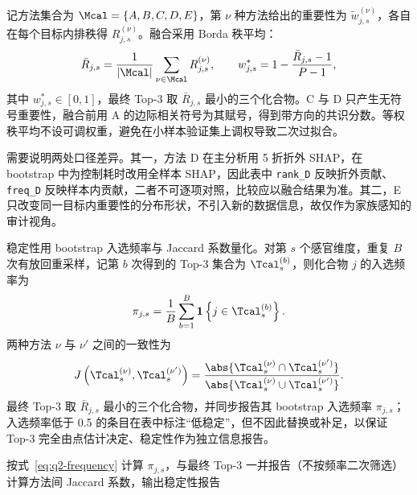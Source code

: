 记方法集合为 $\Mcal=\{A,B,C,D,E\}$，第 $\nu$ 种方法给出的重要性为 $\tilde{w}_{j,s}^{(\nu)}$，各自在每个目标内排秩得 $R^{(\nu)}_{j,s}$。融合采用 Borda 秩平均：
\begin{equation}
  \bar{R}_{j,s}=\frac{1}{|\Mcal|}\sum_{\nu\in\Mcal}R^{(\nu)}_{j,s},
  \qquad
  w_{j,s}^{*}=1-\frac{\bar{R}_{j,s}-1}{P-1},
  \label{eq:q2-ensemble}
\end{equation}
其中 $w_{j,s}^{*}\in[0,1]$，最终 Top-3 取 $\bar{R}_{j,s}$ 最小的三个化合物。C 与 D 只产生无符号重要性，融合前用 A 的边际相关符号为其赋号，得到带方向的共识分数。等权秩平均不设可调权重，避免在小样本验证集上调权导致二次过拟合。

需要说明两处口径差异。其一，方法 D 在主分析用 5 折折外 SHAP，在 bootstrap 中为控制耗时改用全样本 SHAP，因此表中 \texttt{rank\_D} 反映折外贡献、\texttt{freq\_D} 反映样本内贡献，二者不可逐项对照，比较应以融合结果为准。其二，E 只改变同一目标内重要性的分布形状，不引入新的数据信息，故仅作为家族感知的审计视角。

稳定性用 bootstrap 入选频率与 Jaccard 系数量化。对第 $s$ 个感官维度，重复 $B$ 次有放回重采样，记第 $b$ 次得到的 Top-3 集合为 $\Tcal_s^{(b)}$，则化合物 $j$ 的入选频率为
\begin{equation}
  \pi_{j,s}=\frac{1}{B}\sum_{b=1}^{B}\mathbf{1}\left\{j\in\Tcal_s^{(b)}\right\}.
  \label{eq:q2-frequency}
\end{equation}
两种方法 $\nu$ 与 $\nu'$ 之间的一致性为
\begin{equation}
  J\left(\Tcal_s^{(\nu)},\Tcal_s^{(\nu')}\right)=
  \frac{\abs{\Tcal_s^{(\nu)}\cap\Tcal_s^{(\nu')}}}
  {\abs{\Tcal_s^{(\nu)}\cup\Tcal_s^{(\nu')}}}.
  \label{eq:q2-jaccard}
\end{equation}
最终 Top-3 取 $\bar{R}_{j,s}$ 最小的三个化合物，并同步报告其 bootstrap 入选频率 $\pi_{j,s}$；入选频率低于 0.5 的条目在表中标注“低稳定”，但不因此替换或补足，以保证 Top-3 完全由点估计决定、稳定性作为独立信息报告\citep{efron1979bootstrap,jaccard1901etude}。

\begin{algorithm}[htbp]
  \small
  \caption{基于 bootstrap 的 Top-3 稳定性选择}
  \label{alg:stability}
  按式~\eqref{eq:q2-frequency} 计算 $\pi_{j,s}$，与最终 Top-3 一并报告（不按频率二次筛选）\;
  计算方法间 Jaccard 系数，输出稳定性报告\;
\end{algorithm}


